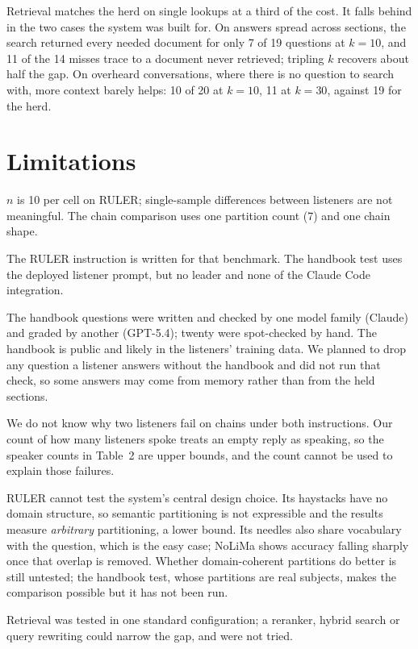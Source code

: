 \documentclass[11pt]{article}
\begin{document}
Retrieval matches the herd on single lookups at a third of the cost. It falls behind in
the two cases the system was built for. On answers spread across sections, the search
returned every needed document for only 7 of 19 questions at $k{=}10$, and 11 of the 14
misses trace to a document never retrieved; tripling $k$ recovers about half the gap.
On overheard conversations, where there is no question to search with, more context
barely helps: 10 of 20 at $k{=}10$, 11 at $k{=}30$, against 19 for the herd.

\section{Limitations}

$n$ is 10 per cell on RULER; single-sample differences between listeners are not
meaningful. The chain comparison uses one partition count (7) and one chain shape.

The RULER instruction is written for that benchmark. The handbook test uses the
deployed listener prompt, but no leader and none of the Claude Code integration.

The handbook questions were written and checked by one model family (Claude) and graded
by another (GPT-5.4); twenty were spot-checked by hand. The handbook is public and
likely in the listeners' training data. We planned to drop any question a listener
answers without the handbook and did not run that check, so some answers may come from
memory rather than from the held sections.

We do not know why two listeners fail on chains under both instructions. Our count of
how many listeners spoke treats an empty reply as speaking, so the speaker counts in
Table~2 are upper bounds, and the count cannot be used to explain those failures.

RULER cannot test the system's central design choice. Its haystacks have no domain
structure, so semantic partitioning is not expressible and the results measure
\emph{arbitrary} partitioning, a lower bound. Its needles also share vocabulary with the
question, which is the easy case; NoLiMa \cite{nolima} shows accuracy falling sharply
once that overlap is removed. Whether domain-coherent partitions do better is still untested; the handbook
test, whose partitions are real subjects, makes the comparison possible but it has not
been run.

Retrieval was tested in one standard configuration; a reranker, hybrid search or
query rewriting could narrow the gap, and were not tried.
\end{document}
